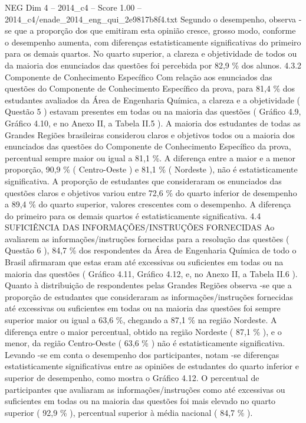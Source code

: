 \begin{textsample}{NEG Dim 4 – 2014\_c4 – Score 1.00 – 2014\_c4/enade\_2014\_eng\_qui\_2e9817b8f4.txt}
Segundo o desempenho, observa -se que a proporção dos que emitiram esta opinião cresce, grosso modo, conforme o desempenho aumenta, com diferenças estatisticamente significativas do primeiro para os demais quartos.
No quarto superior, a clareza e objetividade de todos ou da maioria dos enunciados das questões foi percebida por 82,9 \% dos alunos. 4.3.2 Componente de Conhecimento Específico Com relação aos enunciados das questões do Componente de Conhecimento Específico da prova, para 81,4 \% dos estudantes avaliados da Área de Engenharia Química, a clareza e a objetividade ( Questão 5 ) estavam presentes em todas ou na maioria das questões ( Gráfico 4.9, Gráfico 4.10, e no Anexo II, a Tabela II.5 ).
A maioria dos estudantes de todas as Grandes Regiões brasileiras considerou claros e objetivos todos ou a maioria dos enunciados das questões do Componente de Conhecimento Específico da prova, percentual sempre maior ou igual a 81,1 \%.
A diferença entre a maior e a menor proporção, 90,9 \% ( Centro-Oeste ) e 81,1 \% ( Nordeste ), não é estatisticamente significativa.
A proporção de estudantes que consideraram os enunciados das questões claros e objetivos variou entre 72,6 \% do quarto inferior de desempenho a 89,4 \% do quarto superior, valores crescentes com o desempenho.
A diferença do primeiro para os demais quartos é estatisticamente significativa. 4.4 SUFICIÊNCIA DAS INFORMAÇÕES/INSTRUÇÕES FORNECIDAS Ao avaliarem as informações/instruções fornecidas para a resolução das questões ( Questão 6 ), 84,7 \% dos respondentes da Área de Engenharia Química de todo o Brasil afirmaram que estas eram até excessivas ou suficientes em todas ou na maioria das questões ( Gráfico 4.11, Gráfico 4.12, e, no Anexo II, a Tabela II.6 ).
Quanto à distribuição de respondentes pelas Grandes Regiões observa -se que a proporção de estudantes que consideraram as informações/instruções fornecidas até excessivas ou suficientes em todas ou na maioria das questões foi sempre superior maior ou igual a 63,6 \%, chegando a 87,1 \% na região Nordeste.
A diferença entre o maior percentual, obtido na região Nordeste ( 87,1 \% ), e o menor, da região Centro-Oeste ( 63,6 \% ) não é estatisticamente significativa.
Levando -se em conta o desempenho dos participantes, notam -se diferenças estatisticamente significativas entre as opiniões de estudantes do quarto inferior e superior de desempenho, como mostra o Gráfico 4.12.
O percentual de participantes que avaliaram as informações/instruções como até excessivas ou suficientes em todas ou na maioria das questões foi mais elevado no quarto superior ( 92,9 \% ), percentual superior à média nacional ( 84,7 \% ).

\end{textsample}
